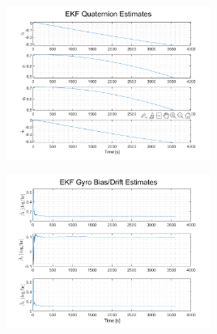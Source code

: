 \documentclass[12pt]{report}
\begin{document}
\begin{figure}[h!]
	\centering
	\begin{minipage}{.5\textwidth}
		\centering
		\includegraphics[height=5cm, keepaspectratio]{ekfQuatEst.png}
		\label{fig:ex1}
	\end{minipage}%
	\begin{minipage}{.5\textwidth}
		\centering
		\includegraphics[height=5cm, keepaspectratio]{ekfBiasEst.png}
		\label{fig:ex2}
	\end{minipage}
\end{figure}
\end{document}
